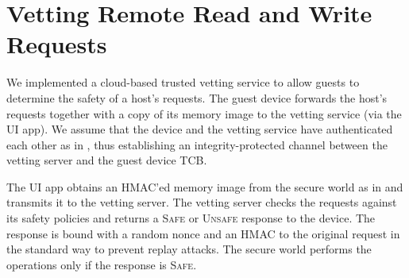 \section{Vetting Remote Read and Write Requests}
\label{section:vetting}

We implemented a cloud-based trusted vetting service to allow guests to
determine the safety of a host's requests. The guest device forwards the host's
requests together with a copy of its memory image to the vetting service (via
the UI app). We assume that the device and the vetting service have
authenticated each other as in , thus
establishing an integrity-protected channel between the vetting server and the
guest device TCB.

The UI app obtains an HMAC'ed memory image from the secure world as in
 and transmits it to the vetting server. The
vetting server checks the requests against its safety policies and returns a
\textsc{Safe} or \textsc{Unsafe} response to the device. The response is bound
with a random nonce and an HMAC to the original request in the standard way to
prevent replay attacks. The secure world performs the operations only if the
response is \textsc{Safe}. 

